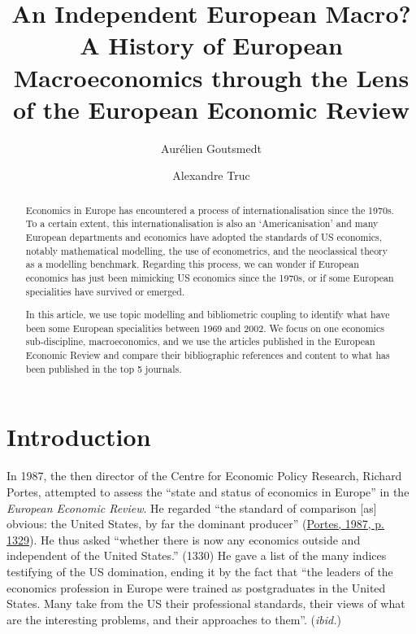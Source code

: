 \documentclass[]{elsarticle} %
\begin{document}
\begin{frontmatter}

  \title{An Independent European Macro? A History of European
Macroeconomics through the Lens of the European Economic Review}
    \author[1]{Aurélien Goutsmedt}
  
    \author[2]{Alexandre Truc}
  
      \address[1]{UCLouvain, ISPOLE. Collège Jacques Leclercq, Place
Montesquieu, 1/L 2.08.07, 1348 - Louvain-la-Neuve.}
    \address[2]{Université Côte d'Azur, CNRS GREDEG France.}
  
  \begin{abstract}
  Economics in Europe has encountered a process of internationalisation
  since the 1970s. To a certain extent, this internationalisation is
  also an `Americanisation' and many European departments and economics
  have adopted the standards of US economics, notably mathematical
  modelling, the use of econometrics, and the neoclassical theory as a
  modelling benchmark. Regarding this process, we can wonder if European
  economics has just been mimicking US economics since the 1970s, or if
  some European specialities have survived or emerged.

  In this article, we use topic modelling and bibliometric coupling to
  identify what have been some European specialities between 1969 and
  2002. We focus on one economics sub-discipline, macroeconomics, and we
  use the articles published in the European Economic Review and compare
  their bibliographic references and content to what has been published
  in the top 5 journals.
  \end{abstract}
  
 \end{frontmatter}

\hypertarget{introduction}{%
\section{Introduction}\label{introduction}}

In 1987, the then director of the Centre for Economic Policy Research,
Richard Portes, attempted to assess the ``state and status of economics
in Europe'' in the \emph{European Economic Review}. He regarded ``the
standard of comparison {[}as{]} obvious: the United States, by far the
dominant producer'' (\protect\hyperlink{ref-portes1987}{Portes, 1987, p.
1329}). He thus asked ``whether there is now any economics outside and
independent of the United States.'' (1330) He gave a list of the many
indices testifying of the US domination, ending it by the fact that
``the leaders of the economics profession in Europe were trained as
postgraduates in the United States. Many take from the US their
professional standards, their views of what are the interesting
problems, and their approaches to them''. (\emph{ibid.})
\end{document}
